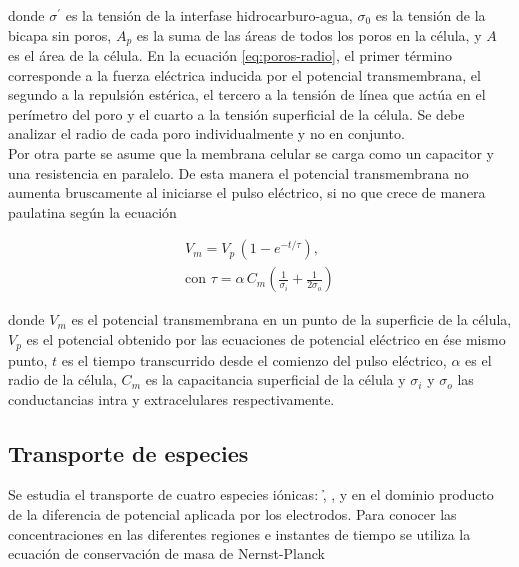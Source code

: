 donde $\sigma^\prime$ es la tensión de la interfase hidrocarburo-agua, $\sigma_0$ es la tensión de la bicapa sin poros, $A_p$ es la suma de las áreas de todos los poros en la célula, y $A$ es el área de la célula. En la ecuación \ref{eq:poros-radio}, el primer término corresponde a la fuerza eléctrica inducida por el potencial transmembrana, el segundo a la repulsión estérica, el tercero a la tensión de línea que actúa en el perímetro del poro y el cuarto a la tensión superficial de la célula. Se debe analizar el radio de cada poro individualmente y no en conjunto.\\

Por otra parte se asume que la membrana celular se carga como un capacitor y una resistencia en paralelo. De esta manera el potencial transmembrana no aumenta bruscamente al iniciarse el pulso eléctrico, si no que crece de manera paulatina según la ecuación \cite{hibino}

\begin{equation} \label{eq:capacit} \begin{split}
	V_m = V_p\, (1 - e^{-t/\tau}) , \\ \textrm{con } \tau = \alpha\, C_m \left( \frac{1}{\sigma_i} + \frac{1}{2 \sigma_o} \right)
\end{split} \end{equation}

donde $V_m$ es el potencial transmembrana en un punto de la superficie de la célula, $V_p$ es el potencial obtenido por las ecuaciones de potencial eléctrico en ése mismo punto, $t$ es el tiempo transcurrido desde el comienzo del pulso eléctrico, $\alpha$ es el radio de la célula, $C_m$ es la capacitancia superficial de la célula y $\sigma_i$ y $\sigma_o$ las conductancias intra y extracelulares respectivamente.

\subsection*{Transporte de especies}
Se estudia el transporte de cuatro especies iónicas: \h, \oh, \na y \cl{} en el dominio producto de la diferencia de potencial aplicada por los electrodos. Para conocer las concentraciones en las diferentes regiones e instantes de tiempo se utiliza la ecuación de conservación de masa de Nernst-Planck \cite{c6-fodava}


